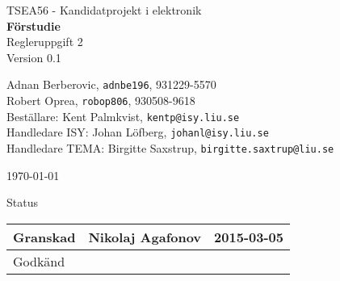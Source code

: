 \documentclass[12pt]{article}
\date{} %
\begin{document}
	\begin{titlepage}
		\begin{center}
			TSEA56 - Kandidatprojekt i elektronik \\[0.5in]
			{\Large\bfseries Förstudie} \\ %
			\vspace{0.5\baselineskip}
			Regleruppgift 2\\
			\vspace{0.5\baselineskip}
			Version 0.1
			
			\vspace{2\baselineskip}
			
			Adnan Berberovic, \texttt{adnbe196}, 931229-5570 \\
			Robert Oprea, \texttt{robop806}, 930508-9618 \\ %
			
			\vspace{4\baselineskip}
			Beställare: Kent Palmkvist, \texttt{kentp@isy.liu.se}\\
			Handledare ISY: Johan Löfberg, \texttt{johanl@isy.liu.se}\\
			Handledare TEMA: Birgitte Saxstrup, \texttt{birgitte.saxtrup@liu.se}\\
			
			\vspace{3\baselineskip}
			
			\today	%
			\vspace{17\baselineskip}
			
			Status			
			\begin{longtable}{|l|l|l|} \hline
				
				Granskad &
				Nikolaj Agafonov& 
				2015-03-05\\ \hline
				Godkänd &
				&
				\\ \hline
				
			\end{longtable}
		\end{center}
	\end{titlepage}
	
\end{document}
